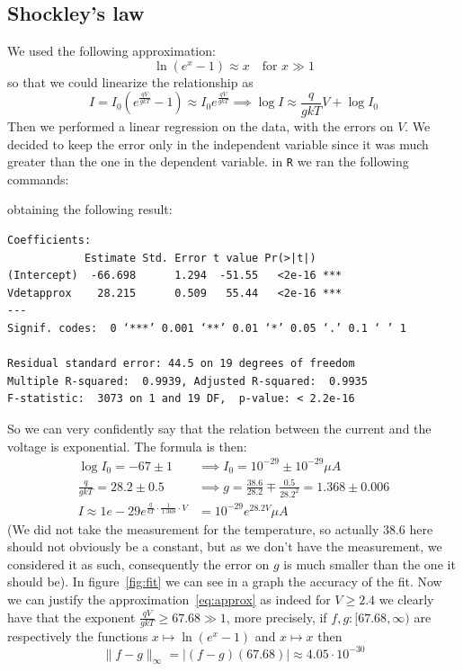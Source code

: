    \subsection{Shockley's law}
    We used the following approximation:
    \begin{equation}\label{eq:approx}
        \ln {(e^{x} - 1)} \approx x \quad \text{for } x \gg 1
    \end{equation}
    so that we could linearize the relationship as
    \[
        I = I_0 \left( e^{\frac{qV}{gkT}} - 1 \right) \approx I_0
        e^{\frac{qV}{gkT}} \implies \log I \approx \frac{q}{gkT} V + \log I_{0}
    \]
    Then we performed a linear regression on the data, with the errors on \(V\).
    We decided to keep the error only in the independent variable since it was
    much greater than the one in the dependent variable. 
   in \texttt{R} we ran the following commands:

   obtaining the following result:
   \begin{verbatim}
Coefficients:
            Estimate Std. Error t value Pr(>|t|)    
(Intercept)  -66.698      1.294  -51.55   <2e-16 ***
Vdetapprox    28.215      0.509   55.44   <2e-16 ***
---
Signif. codes:  0 ‘***’ 0.001 ‘**’ 0.01 ‘*’ 0.05 ‘.’ 0.1 ‘ ’ 1

Residual standard error: 44.5 on 19 degrees of freedom
Multiple R-squared:  0.9939, Adjusted R-squared:  0.9935 
F-statistic:  3073 on 1 and 19 DF,  p-value: < 2.2e-16  
   \end{verbatim}
   So we can very confidently say that the relation between the current and the
   voltage is exponential. The formula is then:
   \begin{align*}
       \log I_{0} = -67 \pm 1 &\implies I_{0} = 10^{-29} \pm 
       10^{-29} \mu A\\
       \frac{q}{gkT} = 28.2 \pm 0.5 &\implies g = \frac{38.6}{28.2} \mp
       \frac{0.5}{28.2^2} = 1.368 \pm 0.006\\
       I \approx 1e-29 e^{\frac{q}{kT} \cdot \frac{1}{1.368} \cdot V} &= 10^{-29}
       e^{28.2 V} \mu A
   \end{align*}
   (We did not take the measurement for the temperature, so actually 38.6 here
   should not obviously be a constant, but as we don't have the measurement, we
   considered it as such, consequently the error on \(g\) is much smaller than
   the one it should be).
   In figure~\ref{fig:fit} we can see in a graph the accuracy of the fit. Now we
   can justify the approximation~\eqref{eq:approx} as indeed for \(V \ge 2.4\)
   we clearly have that the exponent \(\frac{qV}{gkT} \ge 67.68 \gg 1\), more
   precisely, if \(f, g: [67.68, \infty)\) are respectively the functions \(x
   \mapsto \ln {(e^{x} - 1)}\) and \(x \mapsto x\) then
   \[
       \|f - g\|_{\infty} = |{(f - g)}{(67.68)}| \approx 4.05 \cdot 10^{-30}
   \]
